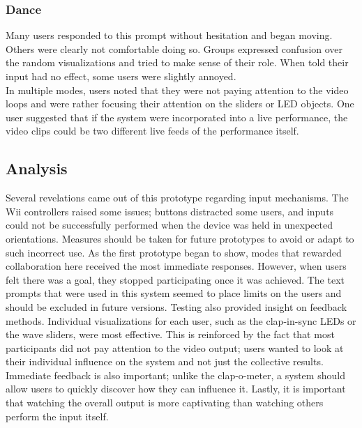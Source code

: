 \subsubsection{Dance}
Many users responded to this prompt without hesitation and began moving. Others were clearly not comfortable doing so. Groups expressed confusion over the random visualizations and tried to make sense of their role. When told their input had no effect, some users were slightly annoyed.\\

In multiple modes, users noted that they were not paying attention to the video loops and were rather focusing their attention on the sliders or LED objects. One user suggested that if the system were incorporated into a live performance, the video clips could be two different live feeds of the performance itself.

\subsection{Analysis}

Several revelations came out of this prototype regarding input mechanisms. The Wii controllers raised some issues; buttons distracted some users, and inputs could not be successfully performed when the device was held in unexpected orientations. Measures should be taken for future prototypes to avoid or adapt to such incorrect use. As the first prototype began to show, modes that rewarded collaboration here received the most immediate responses. However, when users felt there was a goal, they stopped participating once it was achieved. The text prompts that were used in this system seemed to place limits on the users and should be excluded in future versions. Testing also provided insight on feedback methods. Individual visualizations for each user, such as the clap-in-sync LEDs or the wave sliders, were most effective. This is reinforced by the fact that most participants did not pay attention to the video output; users wanted to look at their individual influence on the system and not just the collective results. Immediate feedback is also important; unlike the clap-o-meter, a system should allow users to quickly discover how they can influence it. Lastly, it is important that watching the overall output is more captivating than watching others perform the input itself.


